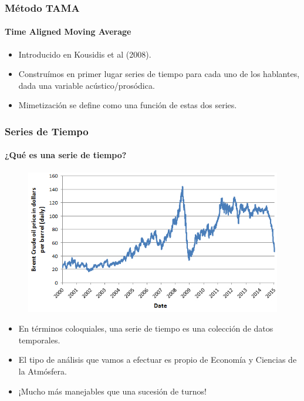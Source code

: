 \begin{frame}
  \frametitle{Método TAMA}
  \framesubtitle{Time Aligned Moving Average}
  \begin{itemize}
    \item Introducido en Kousidis et al (2008).
    \item Construímos en primer lugar series de tiempo para cada uno de los hablantes, dada una variable acústico/prosódica.
    \item Mimetización se define como una función de estas dos series.
  \end{itemize}
\end{frame}


\begin{frame}
  \frametitle{Series de Tiempo}
  \framesubtitle{¿Qué es una serie de tiempo?}

  \begin{figure}[t]
    \includegraphics[scale=0.35]{images/oil_price.jpg}
  \end{figure}

  \begin{itemize}
     \item En términos coloquiales, una serie de tiempo es una colección de datos temporales.
     \item El tipo de análisis que vamos a efectuar es propio de Economía y Ciencias de la Atmósfera.
     \item ¡Mucho más manejables que una sucesión de turnos!
   \end{itemize}
\end{frame}




